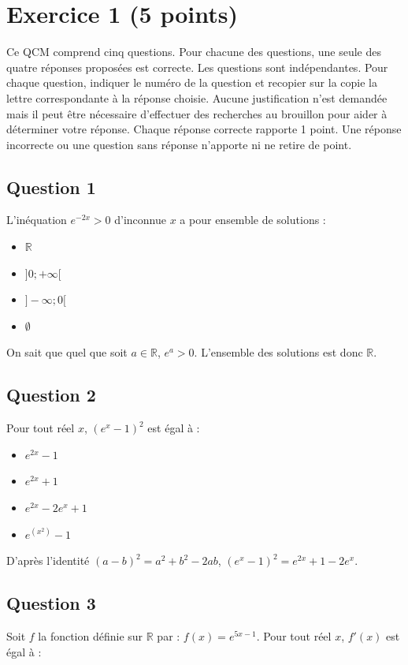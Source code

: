 \section*{Exercice 1 (5 points)}
	
	Ce QCM comprend cinq questions. Pour chacune des questions, une seule des quatre réponses proposées est correcte. Les questions sont indépendantes. Pour chaque question, indiquer le numéro de la question et recopier sur la copie la lettre correspondante à la réponse choisie. Aucune justification n’est demandée mais il peut être nécessaire d’effectuer des recherches au brouillon pour aider à déterminer votre réponse. Chaque réponse correcte rapporte 1 point. Une réponse incorrecte ou une question sans réponse n’apporte ni ne retire de point.
	
	\subsection*{Question 1}
	L’inéquation $e^{-2x} > 0$ d’inconnue $x$ a pour ensemble de solutions :
	
	\begin{itemize}
		\item[a.] $\mathbb{R}$
		\item[b.] $]0 ; +\infty[$
		\item[c.] $]-\infty ; 0[$
		\item[d.] $\emptyset$
	\end{itemize}
	
	On sait que quel que soit $a \in \mathbb{R}$, $e^a > 0$. L’ensemble des solutions est donc $\mathbb{R}$.
	
	\subsection*{Question 2}
	Pour tout réel $x$, $(e^x - 1)^2$ est égal à :
	
	\begin{itemize}
		\item[a.] $e^{2x} - 1$
		\item[b.] $e^{2x} + 1$
		\item[c.] $e^{2x} - 2e^x + 1$
		\item[d.] $e^{(x^2)} - 1$
	\end{itemize}
	
	D’après l’identité $(a - b)^2 = a^2 + b^2 - 2ab$, $(e^x - 1)^2 = e^{2x} + 1 - 2e^x$.
	
	\subsection*{Question 3}
	Soit $f$ la fonction définie sur $\mathbb{R}$ par : $f(x) = e^{5x-1}$. Pour tout réel $x$, $f'(x)$ est égal à :
	
